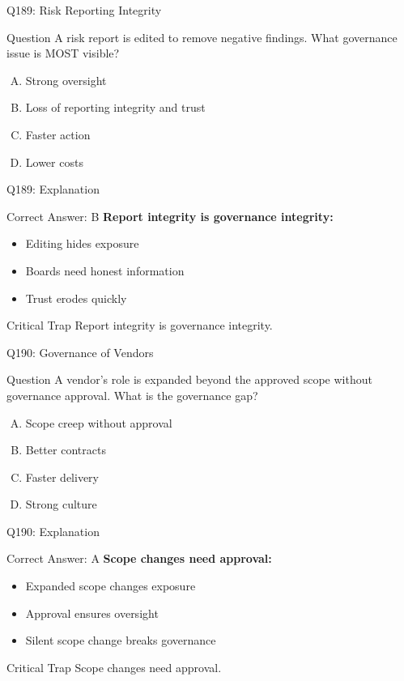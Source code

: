 \documentclass{beamer}
\begin{document}
	\begin{frame}{Q189: Risk Reporting Integrity}
		\begin{block}{Question}
			A risk report is edited to remove negative findings. What governance issue is MOST visible?
		\end{block}
		\begin{enumerate}[(A)]
			\item Strong oversight
			\item Loss of reporting integrity and trust
			\item Faster action
			\item Lower costs
		\end{enumerate}
	\end{frame}
	
	\begin{frame}{Q189: Explanation}
		\begin{block}{Correct Answer: B}
			\textbf{Report integrity is governance integrity:}
			\begin{itemize}
				\item Editing hides exposure
				\item Boards need honest information
				\item Trust erodes quickly
			\end{itemize}
		\end{block}
		\begin{alertblock}{Critical Trap}
			Report integrity is governance integrity.
		\end{alertblock}
	\end{frame}
	
	\begin{frame}{Q190: Governance of Vendors}
		\begin{block}{Question}
			A vendor's role is expanded beyond the approved scope without governance approval. What is the governance gap?
		\end{block}
		\begin{enumerate}[(A)]
			\item Scope creep without approval
			\item Better contracts
			\item Faster delivery
			\item Strong culture
		\end{enumerate}
	\end{frame}
	
	\begin{frame}{Q190: Explanation}
		\begin{block}{Correct Answer: A}
			\textbf{Scope changes need approval:}
			\begin{itemize}
				\item Expanded scope changes exposure
				\item Approval ensures oversight
				\item Silent scope change breaks governance
			\end{itemize}
		\end{block}
		\begin{alertblock}{Critical Trap}
			Scope changes need approval.
		\end{alertblock}
	\end{frame}
	
\end{document}
